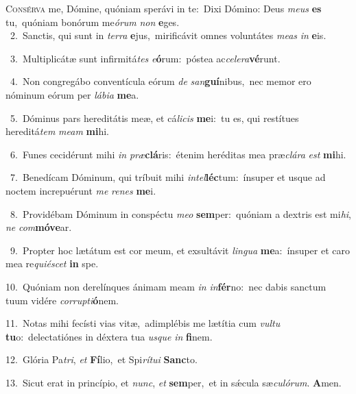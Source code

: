 \lettrine{\initial\textcolor{\initialcolor}{C}}{onsérva} me, Dómine, quóniam sperávi in te:~\dagger Dixi Dómino: Deus \textit{me}\-\textit{us} \textbf{es} tu,~\star quóniam bonórum me\-\textit{ó}\-\textit{rum} \textit{non} \textbf{e}\-ges.\\
{\numbfont\textcolor{\numbcolor}{~2.}}~Sanctis, qui sunt in \textit{ter}\-\textit{ra} \textbf{e}\-jus,~\star mirificávit omnes voluntátes \textit{me}\-\textit{as} \textit{in} \textbf{e}\-is.\par
{\numbfont\textcolor{\numbcolor}{~3.}}~Multiplicátæ sunt infirmitá\textit{tes} \textit{e}\-\textbf{ó}rum:~\star póstea ac\-\textit{ce}\-\textit{le}\textit{ra}\textbf{vé}runt.\par
{\numbfont\textcolor{\numbcolor}{~4.}}~Non congregábo conventícula eórum \textit{de} \textit{san}\-\textbf{guí}nibus,~\star nec memor ero nóminum eórum per \textit{lá}\-\textit{bi}\textit{a} \textbf{me}\-a.\par
{\numbfont\textcolor{\numbcolor}{~5.}}~Dóminus pars hereditátis meæ, et cá\-\textit{li}\-\textit{cis} \textbf{me}\-i:~\star tu es, qui restítues hereditá\textit{tem} \textit{me}\-\textit{am} \textbf{mi}\-hi.\par
{\numbfont\textcolor{\numbcolor}{~6.}}~Funes cecidérunt mihi \textit{in} \textit{præ}\-\textbf{clá}ris:~\star étenim heréditas mea præ\-\textit{clá}\-\textit{ra} \textit{est} \textbf{mi}\-hi.\par
{\numbfont\textcolor{\numbcolor}{~7.}}~Benedícam Dóminum, qui tríbuit mihi \textit{in}\-\textit{tel}\textbf{léc}tum:~\star ínsuper et usque ad noctem increpuérunt \textit{me} \textit{re}\-\textit{nes} \textbf{me}\-i.\par
{\numbfont\textcolor{\numbcolor}{~8.}}~Providébam Dóminum in conspéctu \textit{me}\-\textit{o} \textbf{sem}\-per:~\star quóniam a dextris est mi\-\textit{hi}\-, \textit{ne} \textit{com}\-\textbf{mó}\textbf{ve}ar.\par
{\numbfont\textcolor{\numbcolor}{~9.}}~Propter hoc lætátum est cor meum, et exsultávit \textit{lin}\-\textit{gua} \textbf{me}\-a:~\star ínsuper et caro mea re\-\textit{qui}\-\textit{é}\textit{scet} \textbf{in} spe.\par
{\numbfont\textcolor{\numbcolor}{10.}}~Quóniam non derelínques ánimam meam \textit{in} \textit{in}\-\textbf{fér}no:~\star nec dabis sanctum tuum vidére \textit{cor}\-\textit{rup}\textit{ti}\textbf{ó}nem.\par
{\numbfont\textcolor{\numbcolor}{11.}}~Notas mihi fecísti vias vitæ,~\dagger adimplébis me lætítia cum \textit{vul}\-\textit{tu} \textbf{tu}\-o:~\star delectatiónes in déxtera tua \textit{us}\-\textit{que} \textit{in} \textbf{fi}\-nem.\par
{\numbfont\textcolor{\numbcolor}{12.}}~Glória Pa\-\textit{tri}\-, \textit{et} \textbf{Fí}\-lio,~\star et Spi\-\textit{rí}\-\textit{tu}\textit{i} \textbf{Sanc}\-to.\par
{\numbfont\textcolor{\numbcolor}{13.}}~Sicut erat in princípio, et \textit{nunc}\-, \textit{et} \textbf{sem}\-per,~\star et in sǽcula sæ\-\textit{cu}\-\textit{ló}\textit{rum}. \textbf{A}\-men.\par
